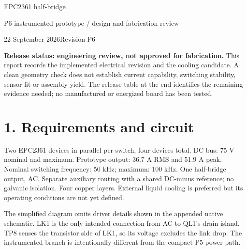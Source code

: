 \documentclass[10pt,a4paper]{article}
\begin{document}
{\Huge EPC2361 half-bridge}\par
{\Large P6 instrumented prototype / design and fabrication review}\par
22 September 2026\hfill Revision P6

\textbf{Release status: engineering review, not approved for fabrication.}
This report records the implemented electrical revision and the cooling candidate. A clean geometry check does not establish current capability, switching stability, sensor fit or assembly yield. The release table at the end identifies the remaining evidence needed; no manufactured or energized board has been tested.

\section*{1. Requirements and circuit}
Two EPC2361 devices in parallel per switch, four devices total. DC bus: 75 V nominal and maximum. Prototype output: 36.7 A RMS and 51.9 A peak. Nominal switching frequency: 50 kHz; maximum: 100 kHz. One half-bridge output, AC. Separate auxiliary routing with a shared DC-minus reference; no galvanic isolation. Four copper layers. External liquid cooling is preferred but its operating conditions are not yet defined.

\begin{center}
\end{center}
The simplified diagram omits driver details shown in the appended native schematic. LK1 is the only intended connection from AC to QL1's drain island. TP8 senses the transistor side of LK1, so its voltage excludes the link drop. The instrumented branch is intentionally different from the compact P5 power path.
\end{document}
